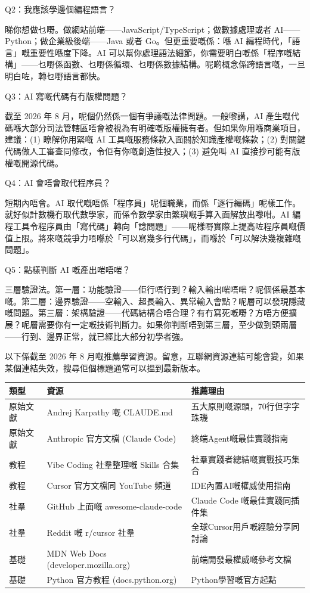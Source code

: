 Q2：我應該學邊個編程語言？

睇你想做乜嘢。做網站前端——JavaScript/TypeScript；做數據處理或者 AI——Python；做企業級後端——Java 或者 Go。但更重要嘅係：喺 AI 編程時代，「語言」嘅重要性喺度下降。AI 可以幫你處理語法細節，你需要明白嘅係「程序嘅結構」——乜嘢係函數、乜嘢係循環、乜嘢係數據結構。呢啲概念係跨語言嘅，一旦明白咗，轉乜嘢語言都快。

Q3：AI 寫嘅代碼有冇版權問題？

截至 2026 年 8 月，呢個仍然係一個有爭議嘅法律問題。一般嚟講，AI 產生嘅代碼喺大部分司法管轄區唔會被視為有明確嘅版權擁有者。但如果你用喺商業項目，建議：(1) 瞭解你用緊嘅 AI 工具嘅服務條款入面關於知識產權嘅條款；(2) 對關鍵代碼做人工審查同修改，令佢有你嘅創造性投入；(3) 避免叫 AI 直接抄可能有版權嘅開源代碼。

Q4：AI 會唔會取代程序員？

短期內唔會。AI 取代嘅唔係「程序員」呢個職業，而係「逐行編碼」呢樣工作。就好似計數機冇取代數學家，而係令數學家由繁瑣嘅手算入面解放出嚟咁。AI 編程工具令程序員由「寫代碼」轉向「諗問題」——呢樣嘢實際上提高咗程序員嘅價值上限。將來嘅競爭力唔喺於「可以寫幾多行代碼」，而喺於「可以解決幾複雜嘅問題」。

Q5：點樣判斷 AI 嘅產出啱唔啱？

三層驗證法。第一層：功能驗證——佢行唔行到？輸入輸出啱唔啱？呢個係最基本嘅。第二層：邊界驗證——空輸入、超長輸入、異常輸入會點？呢層可以發現隱藏嘅問題。第三層：架構驗證——代碼結構合唔合理？有冇寫死嘅嘢？方唔方便擴展？呢層需要你有一定嘅技術判斷力。如果你判斷唔到第三層，至少做到頭兩層——行到、邊界正常，就已經比大部分初學者強。


以下係截至 2026 年 8 月嘅推薦學習資源。留意，互聯網資源連結可能會變，如果某個連結失效，搜尋佢個標題通常可以搵到最新版本。

\begin{center}
\begin{tabularx}{\linewidth}{|X|X|X|}
\hline
\textbf{類型} & \textbf{資源} & \textbf{推薦理由} \tabularnewline
\hline
原始文獻 & Andrej Karpathy 嘅 CLAUDE.md & 五大原則嘅源頭，70行但字字珠璣 \tabularnewline
原始文獻 & Anthropic 官方文檔 (Claude Code) & 終端Agent嘅最佳實踐指南 \tabularnewline
教程 & Vibe Coding 社羣整理嘅 Skills 合集 & 社羣實踐者總結嘅實戰技巧集合 \tabularnewline
教程 & Cursor 官方文檔同 YouTube 頻道 & IDE內置AI嘅權威使用指南 \tabularnewline
社羣 & GitHub 上面嘅 awesome-claude-code & Claude Code 嘅最佳實踐同插件集 \tabularnewline
社羣 & Reddit 嘅 r/cursor 社羣 & 全球Cursor用戶嘅經驗分享同討論 \tabularnewline
基礎 & MDN Web Docs (developer.mozilla.org) & 前端開發最權威嘅參考文檔 \tabularnewline
基礎 & Python 官方教程 (docs.python.org) & Python學習嘅官方起點 \tabularnewline
\hline
\end{tabularx}
\end{center}

